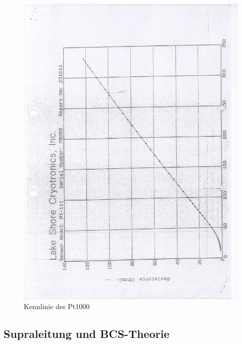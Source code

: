		\begin{figure}[H]
			\center
			\includegraphics[scale=0.4, angle=-90]{messwerte/sl003.jpg}
			\caption{Kennlinie des Pt1000}
			\label{pt1000}
		\end{figure}
	

	\subsection{Supraleitung und BCS-Theorie} %
	\label{sub:supraleitung_und_bcs_theorie}


